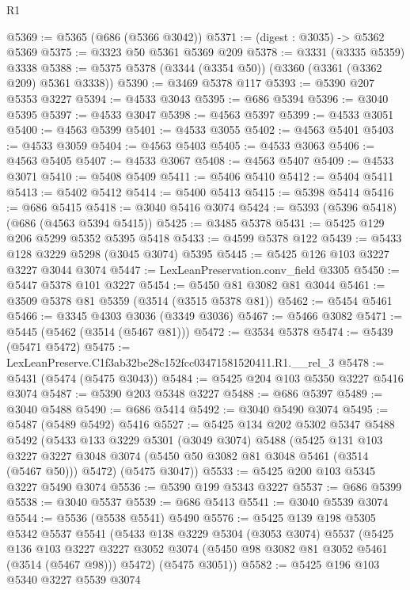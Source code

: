 \begin{lexlean}{R1}
\begin{coremodule}
@5369 := @5365 (@686 (@5366 @3042))
@5371 := (digest : @3035) -> @5362 @5369
@5375 := @3323 @50 @5361 @5369 @209
@5378 := @3331 (@3335 @5359) @3338
@5388 := @5375 @5378 (@3344 (@3354 @50)) (@3360 (@3361 (@3362 @209) @5361 @3338))
@5390 := @3469 @5378 @117
@5393 := @5390 @207 @5353 @3227
@5394 := @4533 @3043
@5395 := @686 @5394
@5396 := @3040 @5395
@5397 := @4533 @3047
@5398 := @4563 @5397
@5399 := @4533 @3051
@5400 := @4563 @5399
@5401 := @4533 @3055
@5402 := @4563 @5401
@5403 := @4533 @3059
@5404 := @4563 @5403
@5405 := @4533 @3063
@5406 := @4563 @5405
@5407 := @4533 @3067
@5408 := @4563 @5407
@5409 := @4533 @3071
@5410 := @5408 @5409
@5411 := @5406 @5410
@5412 := @5404 @5411
@5413 := @5402 @5412
@5414 := @5400 @5413
@5415 := @5398 @5414
@5416 := @686 @5415
@5418 := @3040 @5416 @3074
@5424 := @5393 (@5396 @5418) (@686 (@4563 @5394 @5415))
@5425 := @3485 @5378
@5431 := @5425 @129 @206 @5299 @5352 @5395 @5418
@5433 := @4599 @5378 @122
@5439 := @5433 @128 @3229 @5298 (@3045 @3074) @5395
@5445 := @5425 @126 @103 @3227 @3227 @3044 @3074
@5447 := LexLeanPreservation.conv_field @3305
@5450 := @5447 @5378 @101 @3227
@5454 := @5450 @81 @3082 @81 @3044
@5461 := @3509 @5378 @81 @5359 (@3514 (@3515 @5378 @81))
@5462 := @5454 @5461
@5466 := @3345 @4303 @3036 (@3349 @3036)
@5467 := @5466 @3082
@5471 := @5445 (@5462 (@3514 (@5467 @81)))
@5472 := @3534 @5378
@5474 := @5439 (@5471 @5472)
@5475 := LexLeanPreserve.C1f3ab32be28c152fcc03471581520411.R1.__rel_3
@5478 := @5431 (@5474 (@5475 @3043))
@5484 := @5425 @204 @103 @5350 @3227 @5416 @3074
@5487 := @5390 @203 @5348 @3227
@5488 := @686 @5397
@5489 := @3040 @5488
@5490 := @686 @5414
@5492 := @3040 @5490 @3074
@5495 := @5487 (@5489 @5492) @5416
@5527 := @5425
    @134
    @202
    @5302
    @5347
    @5488
    @5492
    (@5433
      @133
      @3229
      @5301
      (@3049 @3074)
      @5488
      (@5425
        @131
        @103
        @3227
        @3227
        @3048
        @3074
        (@5450 @50 @3082 @81 @3048 @5461 (@3514 (@5467 @50)))
        @5472)
      (@5475 @3047))
@5533 := @5425 @200 @103 @5345 @3227 @5490 @3074
@5536 := @5390 @199 @5343 @3227
@5537 := @686 @5399
@5538 := @3040 @5537
@5539 := @686 @5413
@5541 := @3040 @5539 @3074
@5544 := @5536 (@5538 @5541) @5490
@5576 := @5425
    @139
    @198
    @5305
    @5342
    @5537
    @5541
    (@5433
      @138
      @3229
      @5304
      (@3053 @3074)
      @5537
      (@5425
        @136
        @103
        @3227
        @3227
        @3052
        @3074
        (@5450 @98 @3082 @81 @3052 @5461 (@3514 (@5467 @98)))
        @5472)
      (@5475 @3051))
@5582 := @5425 @196 @103 @5340 @3227 @5539 @3074

\end{coremodule}
\end{lexlean}
